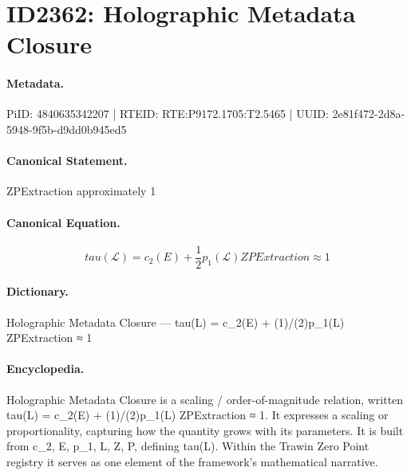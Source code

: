 \section*{ID2362: Holographic Metadata Closure}
\paragraph{Metadata.}
PiID: 4840635342207 | RTEID: RTE:P9172.1705:T2.5465 | UUID: 2e81f472-2d8a-5948-9f5b-d9dd0b945ed5

\paragraph{Canonical Statement.}
ZPExtraction approximately 1

\paragraph{Canonical Equation.}
\[
tau(\mathcal{L}) = c_2(E) + \frac{1}{2}p_1(\mathcal{L}) ZPExtraction \approx 1
\]

\paragraph{Dictionary.}
Holographic Metadata Closure — tau(L) = c\_2(E) + (1)/(2)p\_1(L) ZPExtraction ≈ 1

\paragraph{Encyclopedia.}
Holographic Metadata Closure is a scaling / order-of-magnitude relation, written tau(L) = c\_2(E) + (1)/(2)p\_1(L) ZPExtraction ≈ 1. It expresses a scaling or proportionality, capturing how the quantity grows with its parameters. It is built from c\_2, E, p\_1, L, Z, P, defining tau(L). Within the Trawin Zero Point registry it serves as one element of the framework's mathematical narrative.
